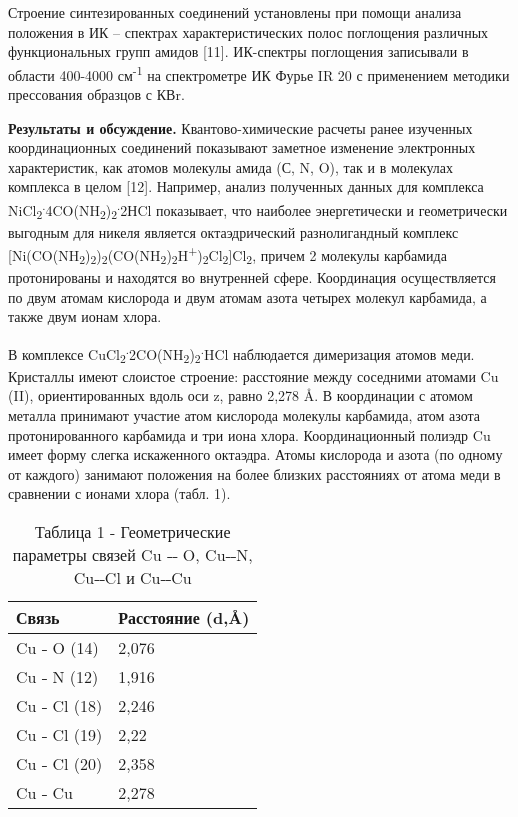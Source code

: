 \begin{multicols}{2}
Строение синтезированных соединений установлены при помощи анализа
положения в ИК -- спектрах характеристических полос поглощения различных
функциональных групп амидов {[}11{]}. ИК-спектры поглощения записывали в
области 400-4000 см\textsuperscript{-1} на спектрометре ИК Фурье IR 20 с
применением методики прессования образцов с КВr.

{\bfseries Результаты и обсуждение.} Квантово-химические расчеты ранее
изученных координационных соединений показывают заметное изменение
электронных характеристик, как атомов молекулы амида (С, N, O), так и в
молекулах комплекса в целом {[}12{]}. Например, анализ полученных данных
для комплекса
NiCl\textsubscript{2}\textsuperscript{.}4CO(NH\textsubscript{2})\textsubscript{2}\textsuperscript{.}2НCl
показывает, что наиболее энергетически и геометрически выгодным для
никеля является октаэдрический разнолигандный комплекс
{[}Ni(CO(NH\textsubscript{2})\textsubscript{2})\textsubscript{2}(CO(NH\textsubscript{2})\textsubscript{2}H\textsuperscript{+})\textsubscript{2}Cl\textsubscript{2}{]}Cl\textsubscript{2},
причем 2 молекулы карбамида протонированы и находятся во внутренней
сфере. Координация осуществляется по двум атомам кислорода и двум атомам
азота четырех молекул карбамида, а также двум ионам хлора.

В комплексе
CuCl\textsubscript{2}\textsuperscript{.}2CO(NH\textsubscript{2})\textsubscript{2}\textsuperscript{.}HCl
наблюдается димеризация атомов меди. Кристаллы имеют слоистое строение:
расстояние между соседними атомами Cu (II), ориентированных вдоль оси z,
равно 2,278 Å. В координации с атомом металла принимают участие атом
кислорода молекулы карбамида, атом азота протонированного карбамида и
три иона хлора. Координационный полиэдр Cu имеет форму слегка
искаженного октаэдра. Атомы кислорода и азота (по одному от каждого)
занимают положения на более близких расстояниях от атома меди в
сравнении с ионами хлора (табл. 1).
\end{multicols}

\begin{table}[H]
\caption*{Таблица 1 - Геометрические параметры связей Cu ˗˗ O, Cu˗˗N, Cu˗˗Cl и Cu˗˗Cu}
\centering
\begin{tabular}{|l|l|}
\hline
Связь & Расстояние (d,Å) \\ \hline
Cu ˗ O (14) & 2,076 \\ \hline
Cu ˗ N (12) & 1,916 \\ \hline
Cu ˗ Cl (18) & 2,246 \\ \hline
Cu ˗ Cl (19) & 2,22 \\ \hline
Cu ˗ Cl (20) & 2,358 \\ \hline
Cu ˗ Cu & 2,278 \\ \hline
\end{tabular}
\end{table}

